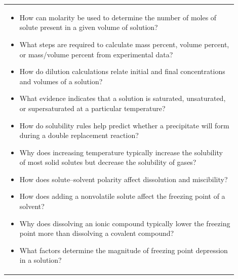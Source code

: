 \documentclass{article}
\begin{document}
\begin{tabular}{|p{0.9\linewidth}|}
\hline
\begin{itemize}
    \item How can molarity be used to determine the number of moles of solute present in a given volume of solution?
    \item What steps are required to calculate mass percent, volume percent, or mass/volume percent from experimental data?
    \item How do dilution calculations relate initial and final concentrations and volumes of a solution?
    \item What evidence indicates that a solution is saturated, unsaturated, or supersaturated at a particular temperature?
    \item How do solubility rules help predict whether a precipitate will form during a double replacement reaction?
    \item Why does increasing temperature typically increase the solubility of most solid solutes but decrease the solubility of gases?
    \item How does solute–solvent polarity affect dissolution and miscibility?
    \item How does adding a nonvolatile solute affect the freezing point of a solvent?
    \item Why does dissolving an ionic compound typically lower the freezing point more than dissolving a covalent compound?
    \item What factors determine the magnitude of freezing point depression in a solution?
\end{itemize}\\[0.2cm]
\end{tabular}
\newpage
\end{document}

